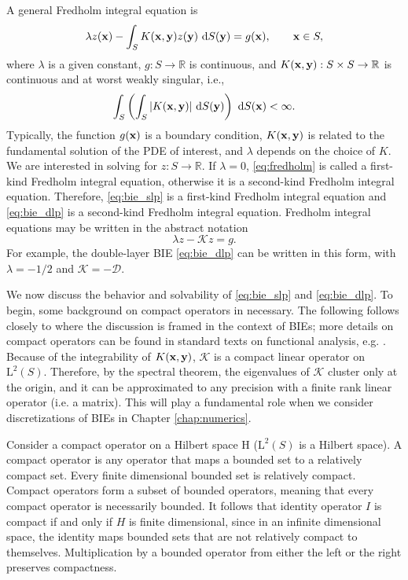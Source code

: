 A general Fredholm integral equation is
\begin{equation}\label{eq:fredholm} \lambda z({\mathbf{x}}) - \int_S K({\mathbf{x}},{\mathbf{y}})z({\mathbf{y}})~\text{d}S({\mathbf{y}}) = g({\mathbf{x}}), \qquad {\mathbf{x}}\in S,\end{equation}
where $\lambda$ is a given constant, $g:S\to\mathbb{R}$ is continuous, and $K({\mathbf{x}},{\mathbf{y}}): S\times S\to \mathbb{R}$ is continuous and at worst weakly singular, i.e.,
\[\int_S\left( \int_{S}| K({\mathbf{x}}, {\mathbf{y}})|~\text{d}S({\mathbf{y}})\right)~\text{d}S({\mathbf{x}}) < \infty.\]
Typically, the function $g({\mathbf{x}})$ is a boundary condition, $K({\mathbf{x}},{\mathbf{y}})$ is related to the fundamental solution of the PDE of interest, and $\lambda$ depends on the choice of $K$. We are interested in solving for $z: S \to\mathbb{R}$. If $\lambda = 0$, \eqref{eq:fredholm} is called a first-kind Fredholm integral equation, otherwise it is a second-kind Fredholm integral equation. Therefore, \eqref{eq:bie_slp} is a first-kind Fredholm integral equation and \eqref{eq:bie_dlp} is a second-kind Fredholm integral equation. Fredholm integral equations may be written in the abstract notation
\begin{equation}\label{eq:fredholm-abstract} \lambda z - \mathcal{K}z = g.\end{equation}
For example, the double-layer BIE \eqref{eq:bie_dlp} can be written in this form, with $\lambda = -1/2$ and $\mathcal{K} = -\mathcal{D}$.  

We now discuss the behavior and solvability of \eqref{eq:bie_slp} and \eqref{eq:bie_dlp}. To begin, some background on compact operators in necessary. The following follows closely to \cite{Karrila1991} where the discussion is framed in the context of BIEs; more details on compact operators can be found in standard texts on functional analysis, e.g.  \cite{Griffel2002}. Because  of the integrability of $K({\mathbf{x}},{\mathbf{y}})$, $\mathcal{K}$ is a compact linear operator on $\text{L}^2(S)$. Therefore, by the spectral theorem, the eigenvalues of $\mathcal{K}$ cluster only at the origin, and it can be approximated to any precision with a finite rank linear operator (i.e. a matrix). This will play a fundamental role when we consider discretizations of BIEs in Chapter \ref{chap:numerics}.

Consider a compact operator on a Hilbert space $\text{H}$ ($\text{L}^2(S)$ is a Hilbert space). A compact operator is any operator that maps a bounded set to a relatively compact set. Every finite dimensional bounded set is relatively compact. Compact operators form a subset of bounded operators, meaning that every compact operator is necessarily bounded. It follows that identity operator $I$ is compact if and only if $H$ is finite dimensional, since in an infinite dimensional space, the identity maps bounded sets that are not relatively compact to themselves.  Multiplication by a bounded operator from either the left or the right preserves compactness. 

